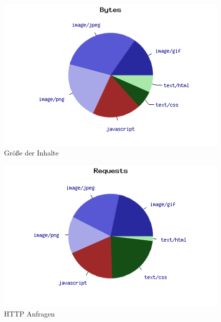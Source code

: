 \begin{figure}[!ht]
  \centering
  \includegraphics[scale=0.5]{material/start_byte_pie.png}
  \caption{Größe der Inhalte}
  \label{fig:startbyte}
\end{figure}
\begin{figure}[!ht]
  \centering
  \includegraphics[scale=0.5]{material/start_request_pie.png}
  \caption{HTTP Anfragen}
  \label{fig:startrequest}
\end{figure}


